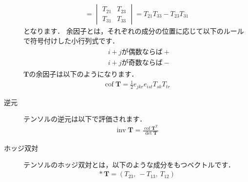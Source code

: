 \begin{description}
\begin{align}
             = \begin{vmatrix}
                T_{21} & T_{23} \\
                T_{31} & T_{33}
               \end{vmatrix}
             = T_{21}T_{33} - T_{23}T_{31}
            \end{align}
            となります．
%
            余因子とは，それぞれの成分の位置に応じて以下のルールで符号付けした小行列式です．
            \begin{align}
             \label{eq:1.37}
             \begin{aligned}
              &\text{$i + j$が偶数ならば$+$} \\
              &\text{$i + j$が奇数ならば$-$}
             \end{aligned}
            \end{align}
            $\bm{T}$の余因子は以下のようになります．
            \begin{align}
             \label{eq:1.38}
             \mathop{\mathrm{cof}}\bm{T} = \frac{1}{2}e_{jkr}e_{ist}T_{sk}T_{tr}
            \end{align}
 \item[逆元]
%
            テンソルの逆元は以下で評価されます．
            \begin{align}
             \label{eq:1.39}
             \mathop{\mathrm{inv}}\bm{T}
             = \frac{\mathop{\mathrm{cof}}\bm{T}^{\mathrm{T}}}{\det\bm{T}}
            \end{align}
 \item[ホッジ双対]
%
            テンソルのホッジ双対とは，以下のような成分をもつベクトルです．
            \begin{align}
             \label{eq:1.40}
             \mathop{*}\bm{T} = (T_{23},\ -T_{13},\ T_{12})
            \end{align}
\end{description}


